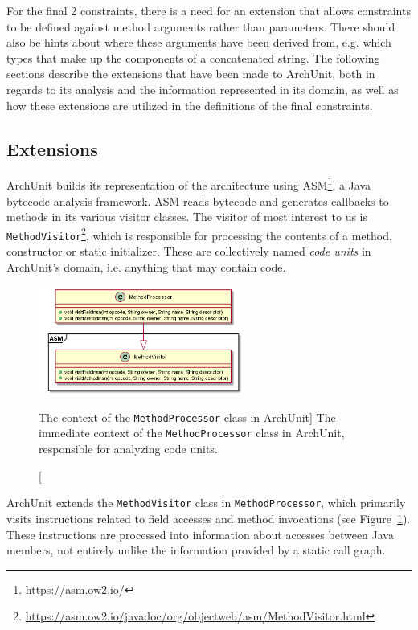 For the final 2 constraints, there is a need for an extension that allows constraints to be defined against method arguments rather than parameters. There should also be hints about where these arguments have been derived from, e.g. which types that make up the components of a concatenated string. The following sections describe the extensions that have been made to ArchUnit, both in regards to its analysis and the information represented in its domain, as well as how these extensions are utilized in the definitions of the final constraints.

\subsection{Extensions}

ArchUnit builds its representation of the architecture using ASM\footnote{\url{https://asm.ow2.io/}}, a Java bytecode analysis framework. ASM reads bytecode and generates callbacks to methods in its various visitor classes. 
The visitor of most interest to us is \texttt{MethodVisitor}\footnote{\url{https://asm.ow2.io/javadoc/org/objectweb/asm/MethodVisitor.html}}, which is responsible for processing the contents of a method, constructor or static initializer. These are collectively named \textit{code units} in ArchUnit's domain, i.e. anything that may contain code.

\begin{figure}
    \centering
    \includegraphics[width=0.6\textwidth]{figure/extension/MethodProcessor1.png}
    \caption
        [The context of the \texttt{MethodProcessor} class in ArchUnit]
        {The immediate context of the \texttt{MethodProcessor} class in ArchUnit, responsible for analyzing code units.}
    \label{fig:method_processor_1}
\end{figure}

ArchUnit extends the \texttt{MethodVisitor} class in \texttt{MethodProcessor}, which primarily visits instructions related to field accesses and method invocations (see Figure~\ref{fig:method_processor_1}). These instructions are processed into information about accesses between Java members, not entirely unlike the information provided by a static call graph.

